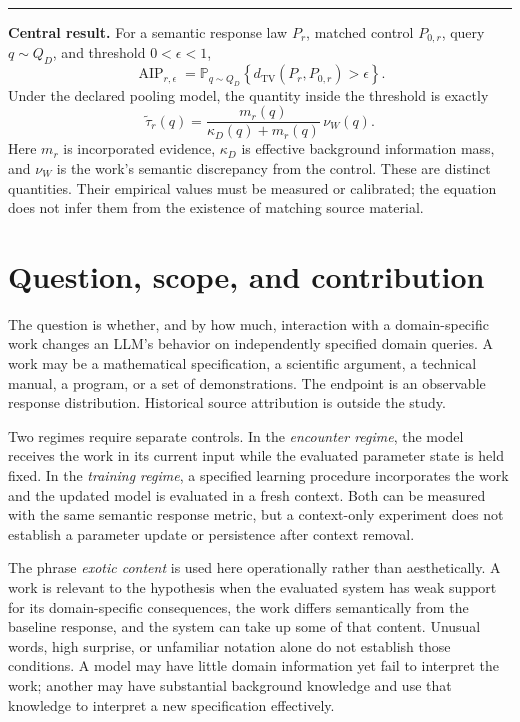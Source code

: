 \documentclass[11pt,letterpaper]{article}
\theoremstyle{definition}\newtheorem{definition}[theorem]{Definition}
\newcommand{\TV}{d_{\mathrm{TV}}}
\newcommand{\AIP}{\operatorname{AIP}}
\newcommand{\Prob}{\mathbb{P}}
\begin{document}
\vspace{6pt}
\begin{center}\color{teal}\rule{0.96\linewidth}{0.6pt}\end{center}
\textbf{Central result.} For a semantic response law $P_r$, matched control $P_{0,r}$, query $q\sim Q_D$, and threshold $0<\epsilon<1$,
\begin{equation*}
\AIP_{r,\epsilon}=\Prob_{q\sim Q_D}\!\left\{\TV(P_r,P_{0,r})>\epsilon\right\}.
\end{equation*}
Under the declared pooling model, the quantity inside the threshold is exactly
\begin{equation*}
\widetilde\tau_r(q)=\frac{m_r(q)}{\kappa_D(q)+m_r(q)}\,\nu_W(q).
\end{equation*}
Here $m_r$ is incorporated evidence, $\kappa_D$ is effective background information mass, and $\nu_W$ is the work's semantic discrepancy from the control. These are distinct quantities. Their empirical values must be measured or calibrated; the equation does not infer them from the existence of matching source material.

\newpage
\section{Question, scope, and contribution}
The question is whether, and by how much, interaction with a domain-specific work changes an LLM's behavior on independently specified domain queries. A work may be a mathematical specification, a scientific argument, a technical manual, a program, or a set of demonstrations. The endpoint is an observable response distribution. Historical source attribution is outside the study.

Two regimes require separate controls. In the \emph{encounter regime}, the model receives the work in its current input while the evaluated parameter state is held fixed. In the \emph{training regime}, a specified learning procedure incorporates the work and the updated model is evaluated in a fresh context. Both can be measured with the same semantic response metric, but a context-only experiment does not establish a parameter update or persistence after context removal.

The phrase \emph{exotic content} is used here operationally rather than aesthetically. A work is relevant to the hypothesis when the evaluated system has weak support for its domain-specific consequences, the work differs semantically from the baseline response, and the system can take up some of that content. Unusual words, high surprise, or unfamiliar notation alone do not establish those conditions. A model may have little domain information yet fail to interpret the work; another may have substantial background knowledge and use that knowledge to interpret a new specification effectively.
\end{document}
